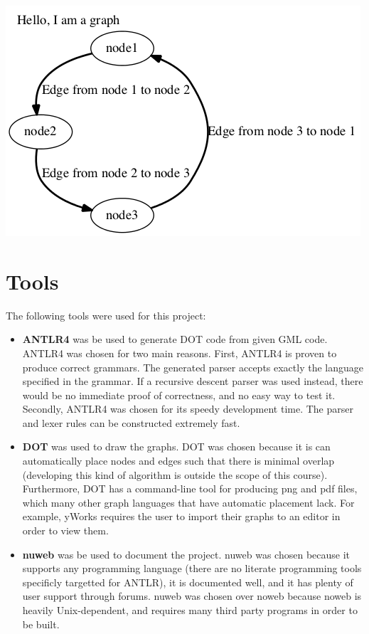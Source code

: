 \documentclass[a4paper]{report}
\begin{document}
 \begin{center}
 \includegraphics[scale=0.5]{test}
 \end{center}
 
\section{Tools}
The following tools were used for this project:
\begin{itemize}
\item \textbf{ANTLR4}\cite{ANTLR4} was be used to generate DOT code from given GML code. ANTLR4 was chosen for two main reasons. First, ANTLR4 is proven to produce correct grammars. The generated parser accepts exactly the language specified in the grammar. If a recursive descent parser was used instead, there would be no immediate proof of correctness, and no easy way to test it. Secondly, ANTLR4 was chosen for its speedy development time. The parser and lexer rules can be constructed extremely fast.
\item \textbf{DOT}\cite{DOT} was used to draw the graphs. DOT was chosen because it is can automatically place nodes and edges such that there is minimal overlap (developing this kind of algorithm is outside the scope of this course). Furthermore, DOT has a command-line tool for producing png and pdf files, which many other graph languages that have automatic placement lack. For example, yWorks\cite{YWORKS} requires the user to import their graphs to an editor in order to view them.
\item \textbf{nuweb}\cite{NUWEB} was be used to document the project. nuweb was chosen because it supports any programming language (there are no literate programming tools specificly targetted for ANTLR), it is documented well, and it has plenty of user support through forums. nuweb was chosen over noweb because noweb is heavily Unix-dependent, and requires many third party programs in order to be built.
\end{itemize}
\end{document}
